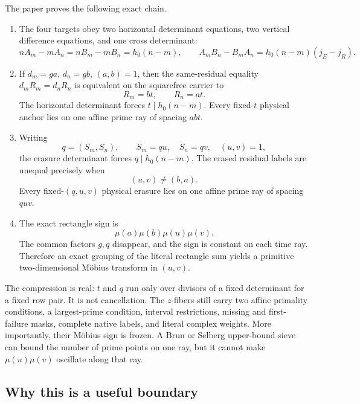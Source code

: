 The paper proves the following exact chain.
\begin{enumerate}[label=\textup{(\arabic*)},leftmargin=3em]
 \item The four targets obey two horizontal determinant equations, two
       vertical difference equations, and one cross determinant:
       \[
       nA_m-mA_n=nB_m-mB_n=h_0(n-m),
       \qquad A_mB_n-B_mA_n=h_0(n-m)(j_E-j_R).
       \]

 \item If \(d_m=ga\), \(d_n=gb\), \((a,b)=1\), then the same-residual
       equality \(d_mR_m=d_nR_n\) is equivalent on the squarefree carrier
       to
       \[
       R_m=bt,\qquad R_n=at.
       \]
       The horizontal determinant forces \(t\mid h_0(n-m)\).  Every
       fixed-\(t\) physical anchor lies on one affine prime ray of spacing
       \(abt\).

 \item Writing
       \[
       q=(S_m,S_n),\qquad S_m=qu,\quad S_n=qv,\quad (u,v)=1,
       \]
       the erasure determinant forces \(q\mid h_0(n-m)\).  The erased
       residual labels are unequal precisely when
       \[
       (u,v)\ne(b,a).
       \]
       Every fixed-\((q,u,v)\) physical erasure lies on one affine prime
       ray of spacing \(quv\).

 \item The exact rectangle sign is
       \[
       \mu(a)\mu(b)\mu(u)\mu(v).
       \]
       The common factors \(g,q\) disappear, and the sign is constant on
       each time ray.  Therefore an exact grouping of the literal
       rectangle sum yields a primitive two-dimensional M\"obius
       transform in \((u,v)\).
\end{enumerate}

The compression is real: \(t\) and \(q\) run only over divisors of a fixed
determinant for a fixed row pair.  It is not cancellation.  The
\(z\)-fibers still carry two affine primality conditions, a largest-prime
condition, interval restrictions, missing and first-failure masks,
complete native labels, and literal complex weights.  More importantly,
their M\"obius sign is frozen.  A Brun or Selberg upper-bound sieve can
bound the number of prime points on one ray, but it cannot make
\(\mu(u)\mu(v)\) oscillate along that ray.

\subsection{Why this is a useful boundary}

